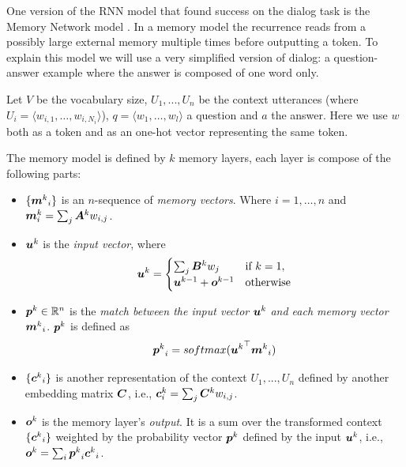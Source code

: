 One version of the RNN model that found success on the dialog task is the Memory Network model \cite{SukhbaatarSWF15}. In a memory model the recurrence reads from a possibly large external memory multiple times before outputting a token. To explain this model we will use a very simplified version of dialog: a question-answer example where the answer is composed of one word only. 

Let $V$ be the vocabulary size, $U_1, ..., U_n$ be the context utterances (where $U_i = \langle w_{i,1} , \dots, w_{i,N_{i}} \rangle$), $q = \langle w_{1} , \dots, w_{l} \rangle$ a question and $a$ the answer. Here we use $w$ both as a token and as an one-hot vector representing the same token.

The memory model is defined by $k$ memory layers, each layer is compose of the following parts:


\begin{itemize}
\item $\{ {\bm{m}^{k}}_i\}$ is an $n$-sequence of \textit{memory vectors}. Where $i = 1, \dots, n$ and $\bm{m}^{k}_i = \sum_{j} \bm{A}^{k}w_{i,j}$.
\item  $\bm{u}^{k}$ is the \textit{input vector}, where
\begin{equation}
\bm{u}^{k}=
\begin{cases}
\sum_{j} \bm{B}^{k}w_{j} & \text{if } k=1, \\
\bm{u}^{k-1} + \bm{o}^{k-1}  & \text{otherwise}\\
\end{cases}
\end{equation}
\item $\bm{p}^{k} \in \mathbb{R}^{n}$ is the \textit{match between the input vector} $\bm{u}^{k}$ \textit{and each memory vector} ${\bm{m}^{k}}_i$. $\bm{p}^{k}$ is defined as
\begin{equation}
{\bm{p}^{k}}_i = softmax({\bm{u}^{k}}^{\top} {\bm{m}^{k}}_i) 
\end{equation}
\item $\{ {\bm{c}^{k}}_i\}$ is another representation of the context $U_1, ..., U_n$ defined by another embedding matrix $\bm{C}$, i.e., $\bm{c}^{k}_i = \sum_{j} \bm{C}^{k}w_{i,j}$.
\item $\bm{o}^{k}$ is the memory layer's  \textit{output}. It is a sum over the transformed context $\{ {\bm{c}^{k}}_i\}$ weighted by the probability vector $\bm{p}^{k}$ defined by the input $\bm{u}^{k}$, i.e.,  $\bm{o}^{k}= \sum_{i} {\bm{p}^{k}}_i {\bm{c}^{k}}_i$.
\end{itemize}

